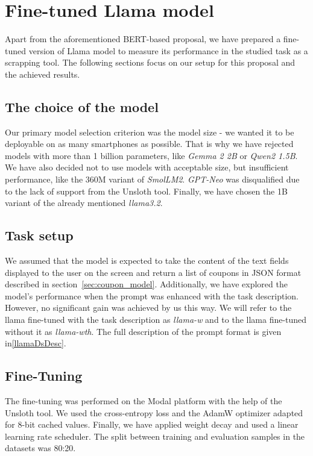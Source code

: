 \documentclass[licencjacka,en]{pracamgr}
\begin{document}
\chapter{Fine-tuned Llama model} \label{chap:llama}
Apart from the aforementioned BERT-based proposal, we have prepared a fine-tuned version of Llama\cite{meta-llama} model to measure its performance in the studied task as a scrapping tool. The following sections focus on our setup for this proposal and the achieved results.

\section{The choice of the model}
Our primary model selection criterion was the model size - we wanted it to be deployable on as many smartphones as possible. That is why we have rejected models with more than 1 billion parameters, like \emph{Gemma 2 2B}\cite{gemma2} or \emph{Qwen2 1.5B}\cite{yang2024qwen2technicalreport}. We have also decided not to use models with acceptable size, but insufficient performance, like the 360M variant of \emph{SmolLM2}\cite{smollm2}. \emph{GPT-Neo}\cite{gpt-neo} was disqualified due to the lack of support from the Unsloth tool. Finally, we have chosen the 1B variant of the already mentioned \emph{llama3.2}.

\section{Task setup}
We assumed that the model is expected to take the content of the text fields displayed to the user on the screen and return a list of coupons in JSON format described in section~\ref{sec:coupon_model}. Additionally, we have explored the model's performance when the prompt was enhanced with the task description. However, no significant gain was achieved by us this way. We will refer to the llama fine-tuned with the task description as \emph{llama-w} and to the llama fine-tuned without it as \emph{llama-wth}. The full description of the prompt format is given in\ref{llamaDsDesc}.
\section{Fine-Tuning}
The fine-tuning was performed on the Modal platform with the help of the Unsloth tool. We used the cross-entropy loss\cite{mao2023crossentropylossfunctionstheoretical} and the AdamW optimizer adapted for 8-bit cached values\cite{hf-bnb}. Finally, we have applied weight decay and used a linear learning rate scheduler. The split between training and evaluation samples in the datasets was 80:20.
\end{document}
